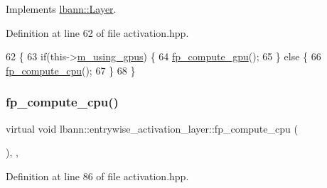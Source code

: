 Implements \hyperlink{classlbann_1_1Layer_a523319dd1bd87a0612afa1912bb5aad7}{lbann\+::\+Layer}.



Definition at line 62 of file activation.\+hpp.


\begin{DoxyCode}
62                              \{
63     \textcolor{keywordflow}{if}(this->\hyperlink{classlbann_1_1Layer_af7881cb5eff5207c15fa835d65462e8f}{m\_using\_gpus}) \{
64       \hyperlink{classlbann_1_1entrywise__activation__layer_aeb270dda0c2ec95dd34c35e1e8300f11}{fp\_compute\_gpu}();
65     \} \textcolor{keywordflow}{else} \{
66       \hyperlink{classlbann_1_1entrywise__activation__layer_a8d4b0376b9783414c1cb7812351122ce}{fp\_compute\_cpu}();
67     \}
68   \}
\end{DoxyCode}
\mbox{\label{classlbann_1_1entrywise__activation__layer_a8d4b0376b9783414c1cb7812351122ce}} 
\subsubsection{\texorpdfstring{fp\+\_\+compute\+\_\+cpu()}{fp\_compute\_cpu()}}
{\footnotesize\ttfamily virtual void lbann\+::entrywise\+\_\+activation\+\_\+layer\+::fp\+\_\+compute\+\_\+cpu (\begin{DoxyParamCaption}{ }\end{DoxyParamCaption})\hspace{0.3cm}{\ttfamily [inline]}, {\ttfamily [protected]}, {\ttfamily [virtual]}}



Definition at line 86 of file activation.\+hpp.


